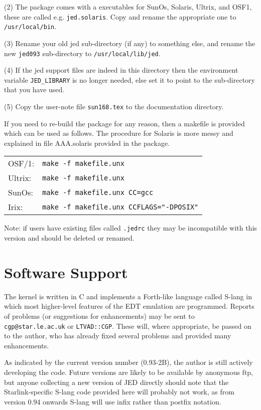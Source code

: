 (2) The package comes with a executables for SunOs, Solaris, Ultrix, and
OSF1, these are called e.g. {\tt jed.solaris}.  Copy and rename the
appropriate one to {\tt /usr/local/bin}.

(3) Rename your old jed sub-directory (if any) to something else, and rename
the new {\tt jed093} sub-directory to {\tt /usr/local/lib/jed}.

(4) If the jed support files are indeed in this directory then the
environment variable {\tt JED\_LIBRARY} is no longer needed, else set it
to point to the sub-directory that you have used.

(5) Copy the user-note file {\tt sun168.tex} to the documentation directory.

If you need to re-build the package for any reason, then a makefile is
provided which can be used as follows.  The procedure for Solaris is more
messy and explained in file AAA.solaris provided in the package.

\begin{tabular}{ll}
OSF/1: & {\tt make -f makefile.unx} \\
Ultrix: & {\tt make -f makefile.unx} \\
SunOs:   & {\tt make -f makefile.unx CC=gcc} \\
Irix:    & {\tt make -f makefile.unx CCFLAGS="-DPOSIX"} \\
\end{tabular}

Note: if users have existing files called {\tt .jedrc} they may be
incompatible with this version and should be deleted or renamed.

\section{Software Support}

The kernel is written in C and implements a Forth-like language called
S-lang in which most higher-level features of the EDT emulation are
programmed.  Reports of problems (or suggestions for enhancements) may be
sent to {\tt cgp@star.le.ac.uk} or {\tt LTVAD::CGP}.  These will, where
appropriate, be passed on to the author, who has already fixed several 
problems and provided many enhancements.

As indicated by the current version number (0.93-2B), the author is still
actively developing the code.  Future versions are likely to be available
by anonymous ftp, but anyone collecting a new version of JED directly
should note that the Starlink-specific S-lang code provided here will
probably not work, as from version 0.94 onwards S-lang will use 
infix rather than postfix notation. 

